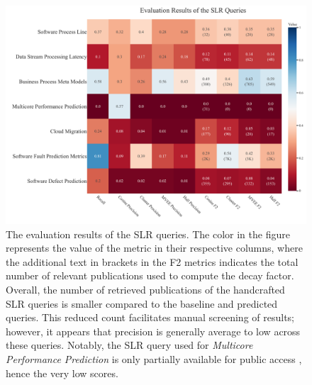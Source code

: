 \documentclass[%
  a4paper,fontsize=11pt,abstract=on,%
  oneside,BCOR=19mm,%
  final %
]{scrreprt}
\begin{document}
\begin{figure}
	\hspace*{-3cm}	
	\includegraphics[scale=0.6]{pics/slr_results.pdf}
	\caption[SLR Queries Results]{The evaluation results of the SLR queries. The color in the figure represents the value of the metric in their respective columns, where the additional text in brackets in the F2 metrics indicates the total number of relevant publications used to compute the decay factor. Overall, the number of retrieved publications of the handcrafted SLR queries is smaller compared to the baseline and predicted queries. This reduced count facilitates manual screening of results; however, it appears that precision is generally average to low across these queries. Notably, the SLR query used for \textit{Multicore Performance Prediction} is only partially available for public access \autocite{Frank2017}, hence the very low scores.} \label{fig:slr-results}

\end{figure}

\printbibliography


\end{document}
